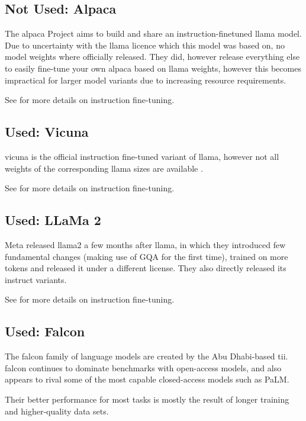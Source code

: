 \subsection{Not Used: Alpaca}\label{sub:alpaca}
The \gls{alpaca} Project \cite{tatsulab_2023} aims to build and share an instruction-finetuned \gls{llama} model. Due to uncertainty with the \gls{llama} licence which this model was based on, no model weights where officially released.
They did, however release everything else to easily fine-tune your own \gls{alpaca} based on \gls{llama} weights, however this becomes impractical for larger model variants due to increasing resource requirements.

See  for more details on instruction fine-tuning.

\subsection{Used: Vicuna}\label{sub:vicuna}
\gls{vicuna} is the official instruction fine-tuned variant of \gls{llama}, however not all weights of the corresponding \gls{llama} sizes are available .

See  for more details on instruction fine-tuning.

\subsection{Used: LLaMa 2}\label{sub:llama2}
\gls{Meta} released \gls{llama2} a few months after \gls{llama}, in which they introduced few fundamental changes (making use of \gls{GQA} for the first time), trained on more tokens and released it under a different license. They also directly released its instruct variants.

See  for more details on instruction fine-tuning.

\subsection{Used: Falcon}\label{sub:falcon}
The \gls{falcon} \cite{zxhang_falcon_2023} family of language models are created by the Abu Dhabi-based \gls{tii}.
\gls{falcon} continues to dominate benchmarks with open-access models, and also appears to rival some of the most capable closed-access models such as \gls{PaLM}.

Their better performance for most tasks is mostly the result of longer training and higher-quality data sets.

